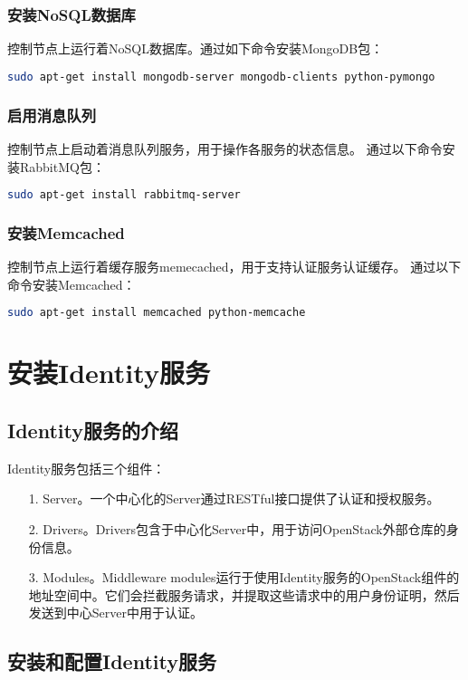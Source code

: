 \documentclass[a4paper,left=2.5cm,right=2.5cm,11pt]{article}
\begin{document}
\subsubsection{安装NoSQL数据库}
	控制节点上运行着NoSQL数据库。通过如下命令安装MongoDB包：
	\begin{lstlisting}[language = bash]
	sudo apt-get install mongodb-server mongodb-clients python-pymongo
	\end{lstlisting}

\subsubsection{启用消息队列}
	控制节点上启动着消息队列服务，用于操作各服务的状态信息。
	通过以下命令安装RabbitMQ包：
	\begin{lstlisting}[language = bash]
	sudo apt-get install rabbitmq-server
	\end{lstlisting}

\subsubsection{安装Memcached}
	控制节点上运行着缓存服务memecached，用于支持认证服务认证缓存。
	通过以下命令安装Memcached：
	\begin{lstlisting}[language = bash]
	sudo apt-get install memcached python-memcache
	\end{lstlisting}

\section{安装Identity服务}
\subsection{Identity服务的介绍}
	Identity服务包括三个组件：
	\begin{itemize}
		\item[1.] Server。一个中心化的Server通过RESTful接口提供了认证和授权服务。
		\item[2.] Drivers。Drivers包含于中心化Server中，用于访问OpenStack外部仓库的身份信息。
		\item[3.] Modules。Middleware modules运行于使用Identity服务的OpenStack组件的地址空间中。它们会拦截服务请求，并提取这些请求中的用户身份证明，然后发送到中心Server中用于认证。
	\end{itemize}

\subsection{安装和配置Identity服务}
\end{document}
